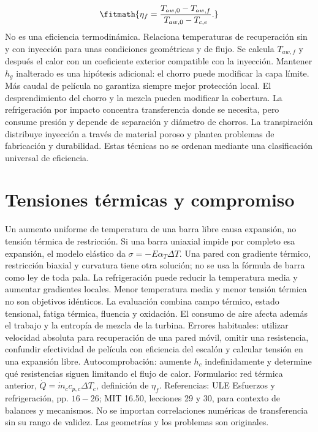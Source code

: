 \documentclass[10pt,openany]{book}
\begin{document}
\[
\fitmath{\eta_f=\frac{T_{aw,0}-T_{aw,f}}{T_{aw,0}-T_{c,e}}.}
\]
No es una eficiencia termodinámica. Relaciona temperaturas de recuperación sin y con inyección para unas condiciones geométricas y de flujo. Se calcula \(T_{aw,f}\) y después el calor con un coeficiente exterior compatible con la inyección. Mantener \(h_g\) inalterado es una hipótesis adicional: el chorro puede modificar la capa límite.
Más caudal de película no garantiza siempre mejor protección local. El desprendimiento del chorro y la mezcla pueden modificar la cobertura. La refrigeración por impacto concentra transferencia donde se necesita, pero consume presión y depende de separación y diámetro de chorros. La transpiración distribuye inyección a través de material poroso y plantea problemas de fabricación y durabilidad. Estas técnicas no se ordenan mediante una clasificación universal de eficiencia.

\section{Tensiones térmicas y compromiso}

Un aumento uniforme de temperatura de una barra libre causa expansión, no tensión térmica de restricción. Si una barra uniaxial impide por completo esa expansión, el modelo elástico da \(\sigma=-E\alpha_T\Delta T\). Una pared con gradiente térmico, restricción biaxial y curvatura tiene otra solución; no se usa la fórmula de barra como ley de toda pala.
La refrigeración puede reducir la temperatura media y aumentar gradientes locales. Menor temperatura media y menor tensión térmica no son objetivos idénticos. La evaluación combina campo térmico, estado tensional, fatiga térmica, fluencia y oxidación. El consumo de aire afecta además el trabajo y la entropía de mezcla de la turbina.
Errores habituales: utilizar velocidad absoluta para recuperación de una pared móvil, omitir una resistencia, confundir efectividad de película con eficiencia del escalón y calcular tensión en una expansión libre. Autocomprobación: aumente \(h_c\) indefinidamente y determine qué resistencias siguen limitando el flujo de calor.
Formulario: red térmica anterior, \(\dot Q=\dot m_cc_{p,c}\Delta T_c\), definición de \(\eta_f\). Referencias: ULE Esfuerzos y refrigeración, pp. \(16-26\); MIT 16.50, lecciones 29 y 30, para contexto de balances y mecanismos. No se importan correlaciones numéricas de transferencia sin su rango de validez. Las geometrías y los problemas son originales.
\end{document}
